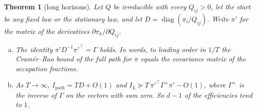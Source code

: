 \documentclass[11pt]{article}
\newtheorem{theorem}{Theorem}[section]
\theoremstyle{definition}
\theoremstyle{remark}
\begin{document}
\begin{theorem}[long horizons]\label{thm:long}
Let $Q$ be irreducible with every $Q_{ij}>0$, let the start be any fixed law or
the stationary law, and let $D=\operatorname{diag}(\pi_i/Q_{ij})$. Write $\pi'$
for the matrix of the derivatives $\partial\pi_k/\partial Q_{ij}$.
\begin{enumerate}[(a),itemsep=1pt]
\item The identity $\pi'D^{-1}\pi'^{\top}=\Gamma$ holds. In words, to leading
 order in $1/T$ the Cram\'er--Rao bound of the full path for $\pi$ equals the
 covariance matrix of the occupation fractions.
\item As $T\to\infty$, $I_{\mathrm{path}}=TD+O(1)$ and
 $I_L\succeq T\,\pi'^{\top}\Gamma^{+}\pi'-O(1)$, where $\Gamma^{+}$ is the
 inverse of $\Gamma$ on the vectors with sum zero. So $d-1$ of the efficiencies
 tend to $1$.
\end{enumerate}
\end{theorem}
\end{document}
